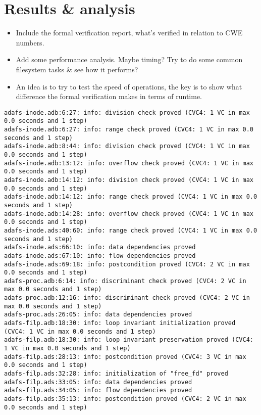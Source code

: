 \section{Results \& analysis}
\begin{itemize}
  \item Include the formal verification report, what's verified in relation to CWE numbers.
  \item Add some performance analysis. Maybe timing? Try to do some common filesystem tasks \& see how it performs?
  \item An idea is to try to test the speed of operations, the key is to show what difference the formal verification makes in terms of runtime.
\end{itemize}

\begin{lstlisting}[basicstyle=\tiny, caption={Excerpt from the prover output (\textnormal{gnatprove})}, label={code:prover output}]
adafs-inode.adb:6:27: info: division check proved (CVC4: 1 VC in max 0.0 seconds and 1 step)
adafs-inode.adb:6:27: info: range check proved (CVC4: 1 VC in max 0.0 seconds and 1 step)
adafs-inode.adb:8:44: info: division check proved (CVC4: 1 VC in max 0.0 seconds and 1 step)
adafs-inode.adb:13:12: info: overflow check proved (CVC4: 1 VC in max 0.0 seconds and 1 step)
adafs-inode.adb:14:12: info: division check proved (CVC4: 1 VC in max 0.0 seconds and 1 step)
adafs-inode.adb:14:12: info: range check proved (CVC4: 1 VC in max 0.0 seconds and 1 step)
adafs-inode.adb:14:28: info: overflow check proved (CVC4: 1 VC in max 0.0 seconds and 1 step)
adafs-inode.ads:40:60: info: range check proved (CVC4: 1 VC in max 0.0 seconds and 1 step)
adafs-inode.ads:66:10: info: data dependencies proved
adafs-inode.ads:67:10: info: flow dependencies proved
adafs-inode.ads:69:18: info: postcondition proved (CVC4: 2 VC in max 0.0 seconds and 1 step)
adafs-proc.adb:6:14: info: discriminant check proved (CVC4: 2 VC in max 0.0 seconds and 1 step)
adafs-proc.adb:12:16: info: discriminant check proved (CVC4: 2 VC in max 0.0 seconds and 1 step)
adafs-proc.ads:26:05: info: data dependencies proved
adafs-filp.adb:18:30: info: loop invariant initialization proved (CVC4: 1 VC in max 0.0 seconds and 1 step)
adafs-filp.adb:18:30: info: loop invariant preservation proved (CVC4: 1 VC in max 0.0 seconds and 1 step)
adafs-filp.ads:28:13: info: postcondition proved (CVC4: 3 VC in max 0.0 seconds and 1 step)
adafs-filp.ads:32:28: info: initialization of "free_fd" proved
adafs-filp.ads:33:05: info: data dependencies proved
adafs-filp.ads:34:05: info: flow dependencies proved
adafs-filp.ads:35:13: info: postcondition proved (CVC4: 2 VC in max 0.0 seconds and 1 step)
\end{lstlisting}

